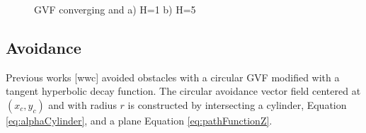 \documentclass[conf]{new-aiaa}
\begin{document}
\begin{figure}[H]
	\begin{subfigmatrix}{2}%
		\centering	
		
		\hspace*{0mm}
	\end{subfigmatrix}
	\caption{GVF converging and a) H=1 b) H=5}
	\label{fig:GVFLine}
\end{figure} 



\subsection{Avoidance}
Previous works [wwc] avoided obstacles with a circular GVF modified with a tangent hyperbolic decay function. The circular avoidance vector field centered at $(x_c,y_c)$ and with radius $r$ is constructed by intersecting a cylinder, Equation \ref{eq:alphaCylinder}, and a plane Equation \ref{eq:pathFunctionZ}. 
\end{document}
